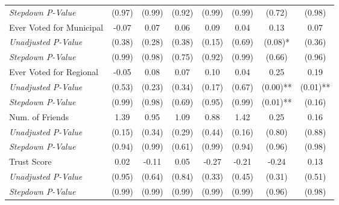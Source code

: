\begin{tabular}{l c c c c c c c}
\quad \textit{Stepdown P-Value} & (0.97) & (0.99) & (0.92) & (0.99) & (0.99) & (0.72) & (0.98) \\
Ever Voted for Municipal & -0.07 & 0.07 & 0.06 & 0.09 & 0.04 & 0.13 & 0.07 \\
\quad \textit{Unadjusted P-Value} & (0.38) & (0.28) & (0.38) & (0.15) & (0.69) & (0.08)* & (0.36) \\
\quad \textit{Stepdown P-Value} & (0.99) & (0.98) & (0.75) & (0.92) & (0.99) & (0.66) & (0.96) \\
Ever Voted for Regional & -0.05 & 0.08 & 0.07 & 0.10 & 0.04 & 0.25 & 0.19 \\
\quad \textit{Unadjusted P-Value} & (0.53) & (0.23) & (0.34) & (0.17) & (0.67) & (0.00)** & (0.01)** \\
\quad \textit{Stepdown P-Value} & (0.99) & (0.98) & (0.69) & (0.95) & (0.99) & (0.01)** & (0.16) \\
Num. of Friends & 1.39 & 0.95 & 1.09 & 0.88 & 1.42 & 0.25 & 0.16 \\
\quad \textit{Unadjusted P-Value} & (0.15) & (0.34) & (0.29) & (0.44) & (0.16) & (0.80) & (0.88) \\
\quad \textit{Stepdown P-Value} & (0.94) & (0.99) & (0.61) & (0.99) & (0.94) & (0.96) & (0.98) \\
Trust Score & 0.02 & -0.11 & 0.05 & -0.27 & -0.21 & -0.24 & 0.13 \\
\quad \textit{Unadjusted P-Value} & (0.95) & (0.64) & (0.84) & (0.33) & (0.45) & (0.31) & (0.51) \\
\quad \textit{Stepdown P-Value} & (0.99) & (0.99) & (0.99) & (0.99) & (0.99) & (0.96) & (0.98) \\
\bottomrule
\end{tabular}
